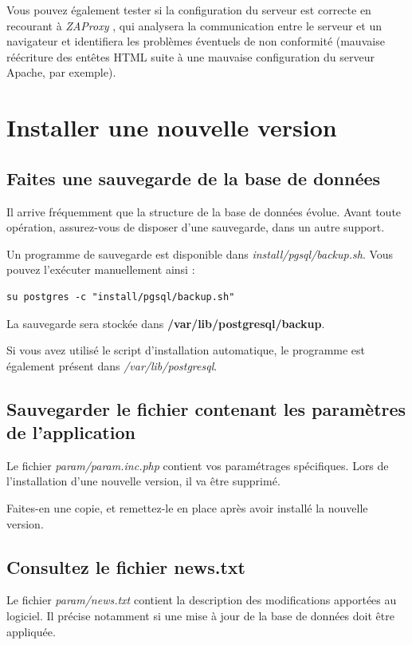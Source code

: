 Vous pouvez également tester si la configuration du serveur est correcte en recourant à \textit{ZAProxy} \cite{zaproxy}, qui analysera la communication entre le serveur et un navigateur et identifiera les problèmes éventuels de non conformité (mauvaise réécriture des entêtes HTML suite à une mauvaise configuration du serveur Apache, par exemple).

\section{Installer une nouvelle version}
\label{newVersion}
\subsection{Faites une sauvegarde de la base de données}
Il arrive fréquemment que la structure de la base de données évolue. Avant toute opération, assurez-vous de disposer d'une sauvegarde, dans un autre support.

Un programme de sauvegarde est disponible dans \textit{install/pgsql/backup.sh}. Vous pouvez l'exécuter manuellement ainsi :
\begin{lstlisting}
su postgres -c "install/pgsql/backup.sh"
\end{lstlisting}

La sauvegarde sera stockée dans \textbf{/var/lib/postgresql/backup}.

Si vous avez utilisé le script d'installation automatique, le programme est également présent dans \textit{/var/lib/postgresql}.

\subsection{Sauvegarder le fichier contenant les paramètres de l'application}

Le fichier \textit{param/param.inc.php} contient vos paramétrages spécifiques. Lors de l'installation d'une nouvelle version, il va être supprimé.

Faites-en une copie, et remettez-le en place après avoir installé la nouvelle version.

\subsection{Consultez le fichier news.txt}

Le fichier \textit{param/news.txt} contient la description des modifications apportées au logiciel. Il précise notamment si une mise à jour de la base de données doit être appliquée.

